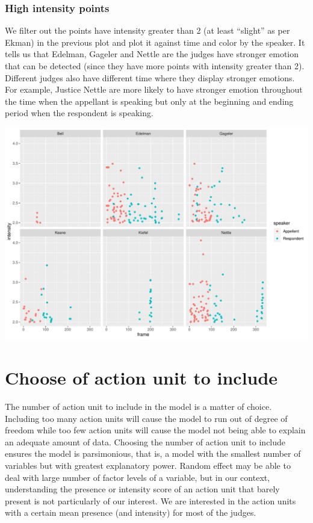 \documentclass{monashthesis}
\begin{document}
\hypertarget{high-intensity-points}{%
\subsubsection{High intensity points}\label{high-intensity-points}}

We filter out the points have intensity greater than 2 (at least ``slight'' as per Ekman) in the previous plot and plot it against time and color by the speaker. It tells us that Edelman, Gageler and Nettle are the judges have stronger emotion that can be detected (since they have more points with intensity greater than 2). Different judges also have different time where they display stronger emotions. For example, Justice Nettle are more likely to have stronger emotion throughout the time when the appellant is speaking but only at the beginning and ending period when the respondent is speaking.

\begin{center}\includegraphics[width=1\linewidth]{figures/high-intensity-points-1} \end{center}

\newpage

\hypertarget{choose-of-action-unit-to-include}{%
\section{Choose of action unit to include}\label{choose-of-action-unit-to-include}}

The number of action unit to include in the model is a matter of choice. Including too many action units will cause the model to run out of degree of freedom while too few action units will cause the model not being able to explain an adequate amount of data. Choosing the number of action unit to include ensures the model is parsimonious, that is, a model with the smallest number of variables but with greatest explanatory power. Random effect may be able to deal with large number of factor levels of a variable, but in our context, understanding the presence or intensity score of an action unit that barely present is not particularly of our interest. We are interested in the action units with a certain mean presence (and intensity) for most of the judges.
\end{document}
